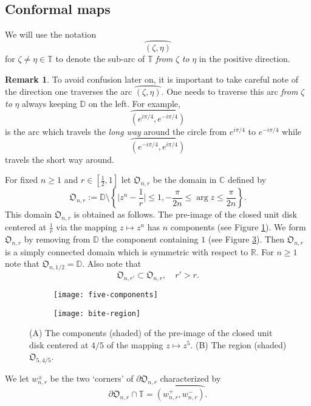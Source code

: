 \documentclass[11pt,reqno]{amsart}
\numberwithin{equation}{section}
\theoremstyle{plain}
\theoremstyle{definition}
\newtheorem{Remark}[equation]{Remark}
\begin{document}
  
\subsection{Conformal maps} 
We will use the notation 
$$\wideparen{(\zeta, \eta)}$$
for
$\zeta\not= \eta\in{\mathbb{T}}$ to denote the sub-arc of ${\mathbb{T}}$  \emph{from} $\zeta$ \emph{to} $\eta$ in the positive direction.
\begin{Remark}
To avoid confusion later on, it is important to take careful note of the direction one traverses the arc $\wideparen{(\zeta,  \eta)}$. One needs to traverse this arc \emph{from} $\zeta$ \emph{to} $\eta$ always keeping ${ \mathbb{D}}$ on the left. For example,
$$\wideparen{(e^{i \pi/4}, e^{-i\pi/4})}$$ is the arc which travels the \emph{long way} around the circle from $e^{i \pi/4}$ to $e^{- i \pi/4}$ while 
$$\wideparen{(e^{-i \pi/4}, e^{i\pi/4})}$$ travels the short way around. 
\end{Remark}

For fixed $n \geq 1$ and $r \in [\frac{1}{2}, 1]$ let ${{\mathfrak{O}}_{n,r}}$ be the domain in ${ \mathbb{C}}$ defined by
\begin{equation*}
	{{\mathfrak{O}}_{n,r}} := 
	{ \mathbb{D}} \setminus \left\{ \Big|z^n-\frac{1}{r} \Big| \leq1, -\frac{\pi}{2n} \leq \arg z \leq \frac{\pi}{2n} \right\}.
\end{equation*}
This domain ${{\mathfrak{O}}_{n,r}}$ is obtained as follows. The pre-image of the closed unit disk centered at $\frac{1}{r}$ via the mapping $z\mapsto  z^n$ has $n$ components (see Figure \ref{FigureX1}).
We form ${{\mathfrak{O}}_{n,r}}$ by removing from ${ \mathbb{D}}$ the component containing $1$  (see Figure \ref{FigureX2}). Then ${{\mathfrak{O}}_{n,r}}$ is a simply connected domain which is symmetric with respect to ${ \mathbb{R}}$. For $n \ge 1$ note that ${\mathfrak{O}}_{n,1/2}={ \mathbb{D}}$. Also note that 
\begin{equation} \label{OOO-dec}
{\mathfrak{O}}_{n, r'} \subset {\mathfrak{O}}_{n, r}, \quad r' > r.
\end{equation}
\begin{figure}
\centering
\begin{subfigure}{.5\textwidth}
  \centering
  \texttt{[image: five-components]}
  \caption{}
  \label{FigureX1}
\end{subfigure}\begin{subfigure}{.5\textwidth}
  \centering
  \texttt{[image: bite-region]}
  \caption{}
  \label{FigureX2}
\end{subfigure}
\caption{{\footnotesize (A) The components (shaded) of the pre-image of the closed unit disk centered at $4/5$ of the mapping $z \mapsto z^5$. (B) The region (shaded) ${\mathfrak{O}}_{5, 4/5}$.}}
\end{figure}
	We let $w^\pm_{n,r}$ be the two `corners' of $\partial{{\mathfrak{O}}_{n,r}}$ characterized by 
$$\partial{{\mathfrak{O}}_{n,r}}\cap {\mathbb{T}}= \wideparen{(w^+_{n,r}, w^-_{n,r})}.$$ 
\end{document}

